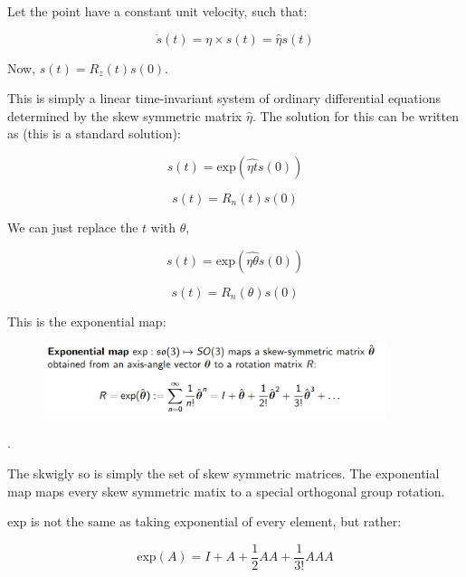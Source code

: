 Let the point have a constant unit velocity, such that:

\begin{equation*}
    \dot{s}(t) = \eta \times s(t) = \hat{\eta} s(t)
\end{equation*}

Now, $s(t) = R_z(t)s(0)$.

This is simply a linear time-invariant system of ordinary differential equations determined by the skew symmetric matrix $\hat{\eta}$. The solution for this can be written as (this is a standard solution):

\begin{equation*}
    s(t) = \text{exp}(\hat{\eta t}s(0))
\end{equation*}

\begin{equation*}
    s(t) = R_n(t)s(0)
\end{equation*}

We can just replace the $t$ with $\theta$,

\begin{equation*}
    s(t) = \text{exp}(\hat{\eta \theta}s(0))
\end{equation*}

\begin{equation*}
    s(t) = R_n(\theta)s(0)
\end{equation*}

This is the exponential map:

\begin{figure}[h]\centering\includegraphics[width=10cm]{img/j_3_14.png}\end{figure}

.

The skwigly so is simply the set of skew symmetric matrices. The exponential map maps every skew symmetric matix to a special orthogonal group rotation.

$\text{exp}$ is not the same as taking exponential of every element, but rather:

\begin{equation*}
    \text{exp}(A) = I + A + \frac{1}{2}AA + \frac{1}{3!}AAA
\end{equation*}

